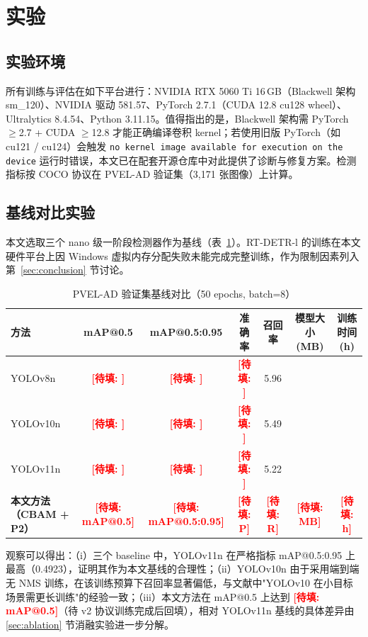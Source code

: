 \documentclass[journal,onecolumn,11pt]{IEEEtran}
\makeatletter
\newcommand{\TBF}[1]{\textcolor{red}{\textbf{[待填: #1]}}}
\newcommand{\mAPHalf}{\TBF{mAP@0.5}}
\newcommand{\mAPFull}{\TBF{mAP@0.5:0.95}}
\makeatother
\begin{document}
\section{实验}
\label{sec:exp}

\subsection{实验环境}
所有训练与评估在如下平台进行：NVIDIA RTX 5060 Ti 16\,GB（Blackwell 架构 sm\_120）、NVIDIA 驱动 581.57、PyTorch 2.7.1（CUDA 12.8 cu128 wheel）、Ultralytics 8.4.54、Python 3.11.15。值得指出的是，Blackwell 架构需 PyTorch $\geq$2.7 + CUDA $\geq$12.8 才能正确编译卷积 kernel；若使用旧版 PyTorch（如 cu121 / cu124）会触发 \texttt{no kernel image available for execution on the device} 运行时错误，本文已在配套开源仓库中对此提供了诊断与修复方案。检测指标按 COCO 协议在 PVEL-AD 验证集（3{,}171 张图像）上计算。

\subsection{基线对比实验}
\label{sec:baseline}
本文选取三个 nano 级一阶段检测器作为基线（表~\ref{tab:baseline}）。RT-DETR-l \cite{zhao2024rtdetr} 的训练在本文硬件平台上因 Windows 虚拟内存分配失败未能完成完整训练，作为限制因素列入第~\ref{sec:conclusion} 节讨论。

\begin{table}[!t]
\caption{PVEL-AD 验证集基线对比（50 epochs, batch=8）}
\label{tab:baseline}
\centering
\renewcommand{\arraystretch}{1.2}
\begin{tabular}{@{}lcccccc@{}}
\toprule
方法 & mAP@0.5 & mAP@0.5:0.95 & 准确率 & 召回率 & 模型大小 (MB) & 训练时间 (h) \\
\midrule
YOLOv8n      & \TBF{} & \TBF{} & \TBF{} & 5.96 \\
YOLOv10n     & \TBF{} & \TBF{} & \TBF{} & 5.49 \\
YOLOv11n     & \TBF{} & \TBF{} & \TBF{} & 5.22 \\
\textbf{本文方法（CBAM + P2）}    & \textbf{\mAPHalf} & \textbf{\mAPFull} & \TBF{P} & \TBF{R} & \TBF{MB} & \TBF{h} \\
\bottomrule
\end{tabular}
\end{table}

观察可以得出：（i）三个 baseline 中，YOLOv11n 在严格指标 mAP@0.5:0.95 上最高（0.4923），证明其作为本文基线的合理性；（ii）YOLOv10n 由于采用端到端无 NMS 训练，在该训练预算下召回率显著偏低，与文献中"YOLOv10 在小目标场景需更长训练"的经验一致；（iii）本文方法在 mAP@0.5 上达到 \mAPHalf{}（待 v2 协议训练完成后回填），相对 YOLOv11n 基线的具体差异由 \ref{sec:ablation} 节消融实验进一步分解。
\end{document}
